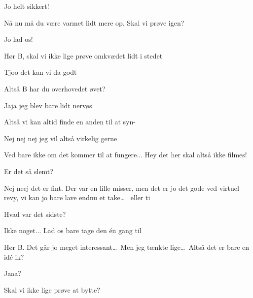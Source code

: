 \documentclass[a4paper,11pt]{article}
\begin{document}
\begin{sketch}
 Jo helt sikkert!


 Nå nu må du være varmet lidt mere op. Skal vi prøve igen?

 Jo lad os!


 Hør B, skal vi ikke lige prøve omkvædet lidt i stedet

 Tjoo det kan vi da godt



  Altså B har du overhovedet øvet?

 Jaja jeg blev bare lidt nervøs

 Altså vi kan altid finde en anden til at syn-

  Nej nej nej jeg vil altså virkelig gerne

 Ved bare ikke om det kommer til at fungere...  Hey det her skal altså ikke filmes!


 Er det så slemt?

 Nej neej det er fint. Der var en lille misser, men det er jo det gode ved
virtuel revy, vi kan jo bare lave endnu et take\ldots\  eller ti

 Hvad var det sidste?

 Ikke noget... Lad os bare tage den én gang til


 Hør B. Det går jo meget interessant\ldots\ Men jeg tænkte lige\ldots\ Altså det er bare en idé ik?

  Jaaa?

 Skal vi ikke lige prøve at bytte?


\end{sketch}
\end{document}
